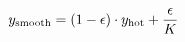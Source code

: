 \documentclass[preview]{standalone}
\begin{document}
\begin{align*}
\special{dvisvgm:raw <g id='unique000'>}y_{\text{smooth}} = (1 - \epsilon) \cdot y_{\text{hot}} + \frac{\epsilon}{K}\special{dvisvgm:raw </g>}
\end{align*}
\end{document}
